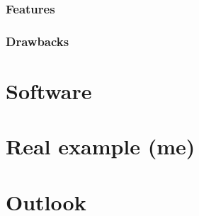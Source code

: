 \documentclass[a4paper]{scrartcl}
\begin{document}
\subsubsection{Features}


\subsubsection{Drawbacks}


\section{Software}
\label{sec:software}


\section{Real example (me)}
\label{sec:example}

\section{Outlook}
\label{sec:outlook}

\newpage
\printbibliography
\end{document}
